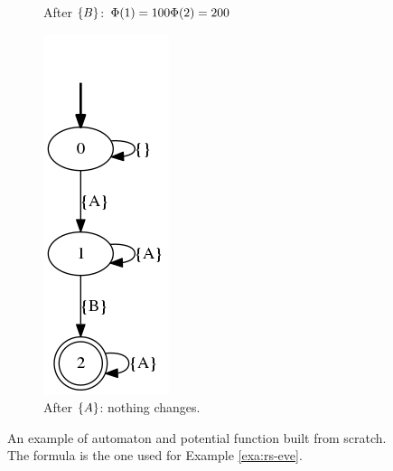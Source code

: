 \begin{example}
\begin{figure}[h!]
\begin{subfigure}[b]{0.2\textwidth}
			\caption{After $\{B\}$: $\Phi(1)=100\\\Phi(2)=200$}
			\label{on-the-fly-example-eve/step6}
		\end{subfigure}
		\hfill
		\begin{subfigure}[b]{0.2\textwidth}
			\includegraphics[width=\textwidth]{images/on-the-fly-example-eve/step7.png}
			\caption{After $\{A\}$: nothing changes.}
		\end{subfigure}
		\caption{An example of automaton and potential function built from scratch. The formula is the one used for Example \ref{exa:rs-eve}.}\label{fig:on-the-fly-example-eve/steps}
	\end{figure}
	

\end{example}
